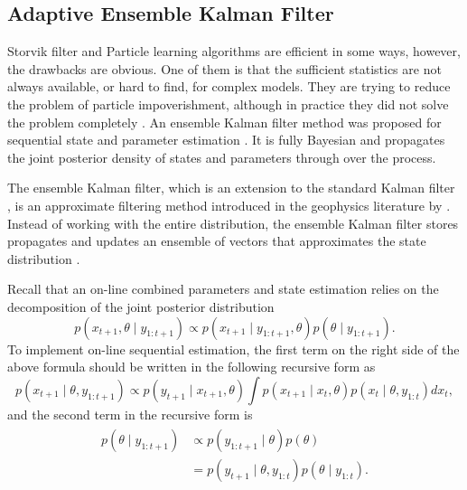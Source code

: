 \subsection{Adaptive Ensemble Kalman Filter}

Storvik filter and Particle learning algorithms are efficient in some ways,  however, the drawbacks are obvious. One of them is that the sufficient statistics are not always available, or hard to find, for complex models. They are trying to reduce the problem of particle impoverishment, although in practice they did not solve the problem completely \cite{chopin2010particle}. An ensemble Kalman filter method was proposed for sequential state and parameter estimation \cite{stroud2016bayesian}. It is fully Bayesian and propagates the joint posterior density of states and parameters through over the process. 


The ensemble Kalman filter, which is an extension to the standard Kalman filter \cite{kalman1960new}, is an approximate filtering method introduced in the geophysics literature by \cite{evensen1994sequential}. Instead of working with the entire distribution, the ensemble Kalman filter stores propagates and updates an ensemble of vectors that approximates the state distribution \cite{katzfuss2016understanding}. 


Recall that an on-line combined parameters and state estimation relies on the decomposition of the joint posterior distribution 
\begin{equation*}\label{jointposterior}
p(x_{t+1},\theta \mid y_{1:t+1}) \propto p(x_{t+1}\mid y_{1:t+1},\theta)p(\theta\mid y_{1:t+1}).
\end{equation*}
To implement on-line sequential estimation, the first term on the right side of the above formula should be written in the following recursive form as 
\begin{equation}\label{jointposteriorterm1}
p(x_{t+1}\mid \theta, y_{1:t+1}) \propto p(y_{t+1}\mid x_{t+1},\theta) \int p(x_{t+1}\mid x_{t},\theta) p(x_{t}\mid \theta, y_{1:t})dx_{t},
\end{equation}
and the second term in the recursive form is 
\begin{align}\label{jointposteriorterm2}
\begin{split}
p(\theta\mid y_{1:t+1}) & \propto p( y_{1:t+1}\mid\theta)p(\theta) \\
&= p(y_{t+1}\mid\theta,y_{1:t})p(\theta\mid y_{1:t}).
\end{split}
\end{align}


